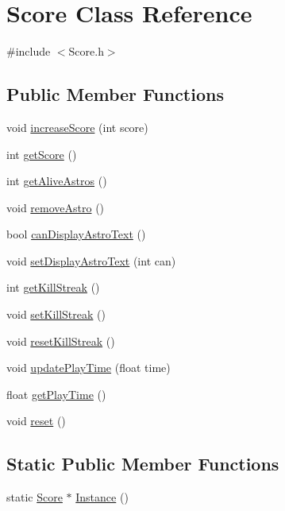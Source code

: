 \hypertarget{class_score}{}\section{Score Class Reference}
\label{class_score}


{\ttfamily \#include $<$Score.\+h$>$}

\subsection*{Public Member Functions}
\begin{DoxyCompactItemize}
\item 
void \hyperlink{class_score_a9be80e91f6252cbb7c59d5212280e00f}{increase\+Score} (int score)
\item 
int \hyperlink{class_score_a8627c93270c188a3fd28a25b1d07a9e7}{get\+Score} ()
\item 
int \hyperlink{class_score_ad997fd059028945d10cfc8c056540a4f}{get\+Alive\+Astros} ()
\item 
void \hyperlink{class_score_ac826af8103f602c71d75d36aeecdff35}{remove\+Astro} ()
\item 
bool \hyperlink{class_score_a915cd675992bb150fcd67b43f7b8732e}{can\+Display\+Astro\+Text} ()
\item 
void \hyperlink{class_score_a3b9b2184527917932481449f410ab3ed}{set\+Display\+Astro\+Text} (int can)
\item 
int \hyperlink{class_score_a3bd9796efe8e7cf9bb1c97597e56bc01}{get\+Kill\+Streak} ()
\item 
void \hyperlink{class_score_af0065ea2bf0bf3c1dc92140a1f7e371f}{set\+Kill\+Streak} ()
\item 
void \hyperlink{class_score_a152a46eb1f165db706409369d4da7959}{reset\+Kill\+Streak} ()
\item 
void \hyperlink{class_score_a767d18294e41930ccece6d48c2398537}{update\+Play\+Time} (float time)
\item 
float \hyperlink{class_score_ae4fc66274baac2f13975f6139681b52c}{get\+Play\+Time} ()
\item 
void \hyperlink{class_score_a32804ba9a847e58160e6e0cef46e1f25}{reset} ()
\end{DoxyCompactItemize}
\subsection*{Static Public Member Functions}
\begin{DoxyCompactItemize}
\item 
static \hyperlink{class_score}{Score} $\ast$ \hyperlink{class_score_a7d5516454642a247be184d5063404d04}{Instance} ()
\end{DoxyCompactItemize}


